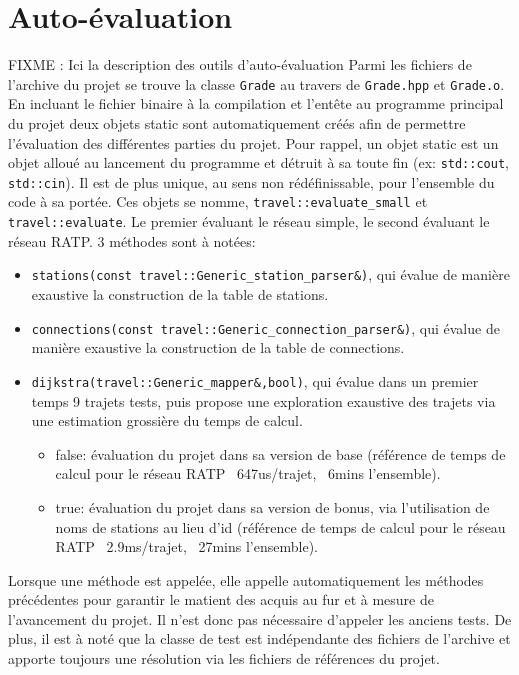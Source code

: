 \documentclass[9pts]{article}
\begin{document}
\section{Auto-évaluation}
FIXME : Ici la description des outils d'auto-évaluation
Parmi les fichiers de l'archive du projet se trouve la classe \texttt{Grade} au travers de \texttt{Grade.hpp} et \texttt{Grade.o}.
En incluant le fichier binaire à la compilation et l'entête au programme principal du projet deux objets static sont automatiquement créés afin de permettre l'évaluation des différentes parties du projet.
Pour rappel, un objet static est un objet alloué au lancement du programme et détruit à sa toute fin (ex: \texttt{std::cout}, \texttt{std::cin}). Il est de plus unique, au sens non rédéfinissable, pour l'ensemble du code à sa portée.
Ces objets se nomme, \texttt{travel::evaluate\_small} et \texttt{travel::evaluate}.
Le premier évaluant le réseau simple, le second évaluant le réseau RATP.
3 méthodes sont à notées:
\begin{itemize}
  \item \texttt{stations(const travel::Generic\_station\_parser\&)}, qui évalue de manière exaustive la construction de la table de stations.
  \item \texttt{connections(const travel::Generic\_connection\_parser\&)}, qui évalue de manière exaustive la construction de la table de connections.
  \item \texttt{dijkstra(travel::Generic\_mapper\&,bool)}, qui évalue dans un premier temps 9 trajets tests, puis propose une exploration exaustive des trajets via une estimation grossière du temps de calcul.
    \begin{itemize}
      \item false: évaluation du projet dans sa version de base (référence de temps de calcul pour le réseau RATP ~647us/trajet, ~6mins l'ensemble).
      \item true: évaluation du projet dans sa version de bonus, via l'utilisation de noms de stations au lieu d'id (référence de temps de calcul pour le réseau RATP ~2.9ms/trajet, ~27mins l'ensemble).
    \end{itemize}
\end{itemize}
Lorsque une méthode est appelée, elle appelle automatiquement les méthodes précédentes pour garantir le matient des acquis au fur et à mesure de l'avancement du projet.
Il n'est donc pas nécessaire d'appeler les anciens tests.
De plus, il est à noté que la classe de test est indépendante des fichiers de l'archive et apporte toujours une résolution via les fichiers de références du projet.
\end{document}
